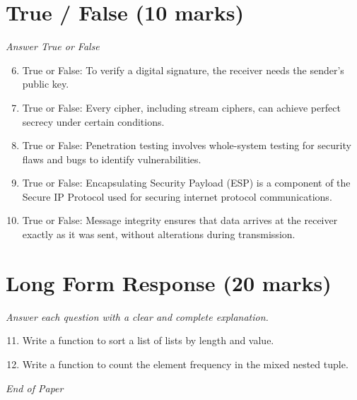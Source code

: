 \documentclass[12pt]{article}
\begin{document}
\section*{True / False (10 marks)}
\textit{Answer True or False}
\begin{enumerate}[label=\arabic*.]
\setcounter{enumi}{5}
\item True or False: To verify a digital signature, the receiver needs the sender's public key.
\item True or False: Every cipher, including stream ciphers, can achieve perfect secrecy under certain conditions.
\item True or False: Penetration testing involves whole-system testing for security flaws and bugs to identify vulnerabilities.
\item True or False: Encapsulating Security Payload (ESP) is a component of the Secure IP Protocol used for securing internet protocol communications.
\item True or False: Message integrity ensures that data arrives at the receiver exactly as it was sent, without alterations during transmission.
\end{enumerate}

\section*{Long Form Response (20 marks)}
\textit{Answer each question with a clear and complete explanation.}
\begin{enumerate}[label=\arabic*.]
\setcounter{enumi}{10}
\item Write a function to sort a list of lists by length and value.
\item Write a function to count the element frequency in the mixed nested tuple.
\end{enumerate}

\vfill
\noindent\textit{End of Paper}
\end{document}
